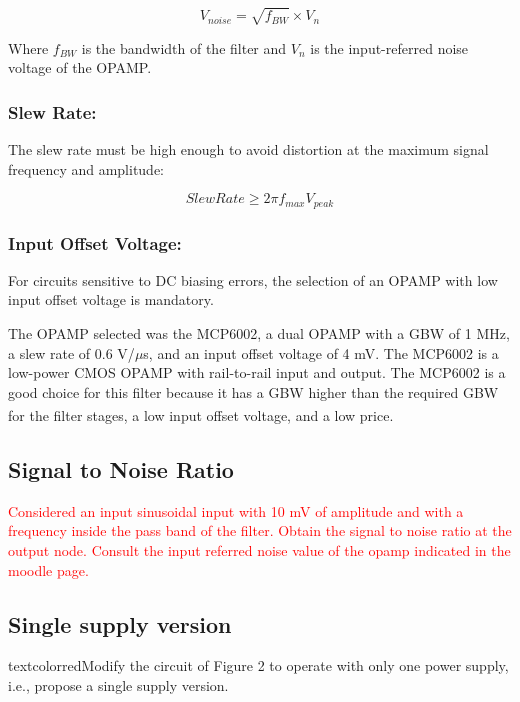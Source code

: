 \begin{equation}
    V_{noise} = \sqrt{f_{BW}} \times V_{n}
\end{equation}

Where $f_{BW}$ is the bandwidth of the filter and $V_{n}$ is the input-referred noise voltage of the OPAMP.

\subsubsection{Slew Rate:}

The slew rate must be high enough to avoid distortion at the maximum signal frequency and amplitude:

\begin{equation}
    Slew Rate \geq 2\pi f_{max} V_{peak}
\end{equation}

\subsubsection{Input Offset Voltage:}

For circuits sensitive to DC biasing errors, the selection of an OPAMP with low input offset voltage is mandatory.

The OPAMP selected was the MCP6002, a dual OPAMP with a GBW of 1 MHz, a slew rate of 0.6 V/$\mu$s, and an input offset voltage of 4 mV. The MCP6002 is a low-power CMOS OPAMP with rail-to-rail input and output. The MCP6002 is a good choice for this filter because it has a GBW higher than the required GBW for the filter stages, a low input offset voltage, and a low price\textsuperscript{\cite{mcp-datasheet}}.

\subsection{Signal to Noise Ratio}
\textcolor{red}{Considered an input sinusoidal input with 10 mV of amplitude and with a frequency inside the
pass band of the filter. Obtain the signal to noise ratio at the output node. Consult the input
referred noise value of the opamp indicated in the moodle page.}

\subsection{Single supply version}
textcolor{red}{Modify the circuit of Figure 2 to operate with only one power supply, i.e., propose a single supply version.}
